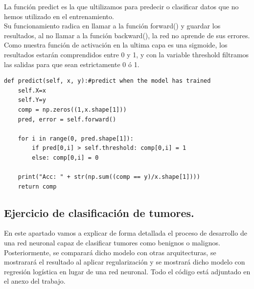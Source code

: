 \documentclass[a4paper,10pt]{article}
\begin{document}
La función predict es la que ultilizamos para predecir o clasificar datos que no hemos utilizado en el entrenamiento.\\ Su funcionamiento radica en llamar a la función forward() y guardar los resultados, al no llamar a la función backward(), la red no aprende de sus errores. \\Como nuestra función de activación en la ultima capa es una sigmoide, los resultados estarán comprendidos entre 0 y 1, y con la variable threshold filtramos las salidas para que sean estrictamente 0 ó 1.  
\begin{lstlisting}
def predict(self, x, y):#predict when the model has trained
    self.X=x
    self.Y=y
    comp = np.zeros((1,x.shape[1]))
    pred, error = self.forward()    
    
    for i in range(0, pred.shape[1]):
        if pred[0,i] > self.threshold: comp[0,i] = 1
        else: comp[0,i] = 0
    
    print("Acc: " + str(np.sum((comp == y)/x.shape[1]))) 
    return comp
\end{lstlisting}
\newpage
\subsection{Ejercicio de clasificación de tumores.}
En este apartado vamos a explicar de forma detallada el proceso de desarrollo de una red neuronal capaz de clasificar tumores como benignos o malignos. Posteriormente, se comparará dicho modelo con otras arquitecturas, se mostrarará el resultado al aplicar regularización y se mostrará dicho modelo con regresión logística en lugar de una red neuronal. Todo el código está adjuntado en el anexo del trabajo.
\end{document}
